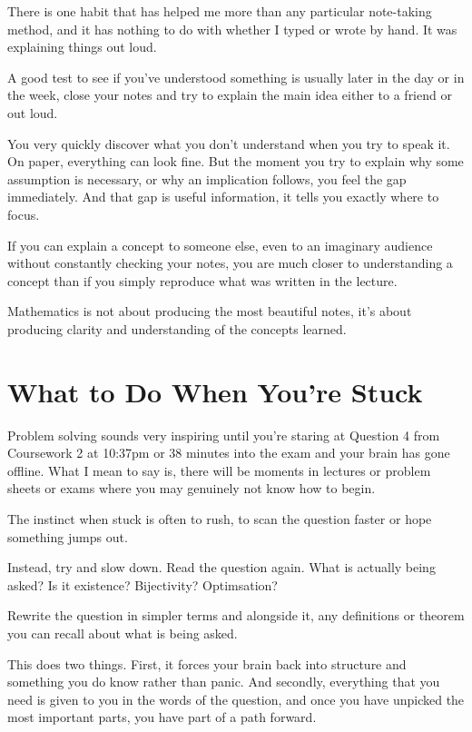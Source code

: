 There is one habit that has helped me more than any particular note-taking method, and it has nothing to do with whether I typed or wrote by hand. It was explaining things out loud. 

A good test to see if you've understood something is usually later in the day or in the week, close your notes and try to explain the main idea either to a friend or out loud. 

You very quickly discover what you don't understand when you try to speak it. On paper, everything can look fine. But the moment you try to explain why some assumption is necessary, or why an implication follows, you feel the gap immediately. And that gap is useful information, it tells you exactly where to focus. 

If you can explain a concept to someone else, even to an imaginary audience without constantly checking your notes, you are much closer to understanding a concept than if you simply reproduce what was written in the lecture. 

Mathematics is not about producing the most beautiful notes, it's about producing clarity and understanding of the concepts learned. 

\section{What to Do When You're Stuck}

Problem solving sounds very inspiring until you're staring at Question 4 from Coursework 2 at 10:37pm or 38 minutes into the exam and your brain has gone offline. What I mean to say is, there will be moments in lectures or problem sheets or exams where you may genuinely not know how to begin. 

The instinct when stuck is often to rush, to scan the question faster or hope something jumps out. 

Instead, try and slow down. Read the question again. What is actually being asked? Is it existence? Bijectivity? Optimsation? 

Rewrite the question in simpler terms and alongside it, any definitions or theorem you can recall about what is being asked. 

This does two things. First, it forces your brain back into structure and something you do know rather than panic. And secondly, everything that you need is given to you in the words of the question, and once you have unpicked the most important parts, you have part of a path forward. 

